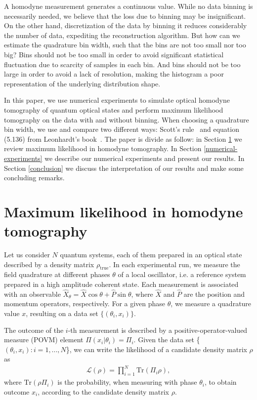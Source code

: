 \documentclass[
reprint,
superscriptaddress,
showpacs,
amsmath,
amssymb,
aps,
pra,
longbibliography
]{revtex4-1}
\newcommand{\rhotrue}{\rho_{\text{true}}}
\begin{document}
A homodyne measurement generates a continuous value. While no data binning is necessarily
needed, we believe that the loss due to binning may be insignificant. On the other hand,
discretization of the data by binning it reduces considerably the number of data, expediting the reconstruction algorithm. But how can we estimate the quadrature bin width, such that the bins are not too small nor too big? Bins should not be too small in order to avoid significant statistical fluctuation due to scarcity of samples in each bin. And bins should not be too large in order to avoid a lack of resolution, making the histogram a poor representation of the underlying distribution shape.
 
In this paper, we use numerical experiments to simulate optical homodyne tomography of quantum optical states and perform maximum likelihood tomography on the data with
and without binning. When choosing a quadrature bin width, we use and compare two different ways: Scott's rule~\cite{Scott2010} and equation (5.136) from Leonhardt's book~\cite{Leonhardt1997}. The paper is divide as follow: in Section \ref{MLE} we review maximum likelihood in homodyne tomography.  In Section \ref{numerical-experiments} we describe our numerical experiments and present our results. In Section \ref{conclusion} we discuss the interpretation of our results and make some concluding remarks.


\section{Maximum likelihood in homodyne tomography}
\label{MLE}
Let us consider $N$ quantum systems, each of them prepared in an optical state described by a density matrix $\rhotrue$. In each experimental run, we measure the field quadrature at different phases $\theta$ of a local oscillator, i.e. a reference system prepared in a high amplitude coherent state. Each measurement is associated with an observable $\hat{X}_{\theta} = \hat{X} \cos \theta + \hat{P} \sin \theta$, where $\hat{X}$ and $\hat{P}$ are the position and momentum operators, respectively. For a given phase $\theta$, we measure a quadrature value $x$, resulting on a data set $\{(\theta_i, x_i)\}$.

The outcome of the $i$-th measurement is described by a positive-operator-valued measure (POVM) element $\Pi (x_i|\theta_i) = \Pi_i$. Given the data set \{$(\theta_{i},
x_i): i = 1, ..., N$\}, we can write the likelihood of a candidate density matrix $\rho$ as
\begin{eqnarray}
\mathcal{L} (\rho)= \prod_{i=1}^{N} \mathrm{Tr} (\Pi_i \rho),
\label{eq-likelihood}
\end{eqnarray}
where $\mathrm{Tr}(\rho \Pi_i)$ is the probability, when measuring with phase $\theta_i$, to obtain outcome $x_i$, according to the candidate density matrix $\rho$.
\end{document}
